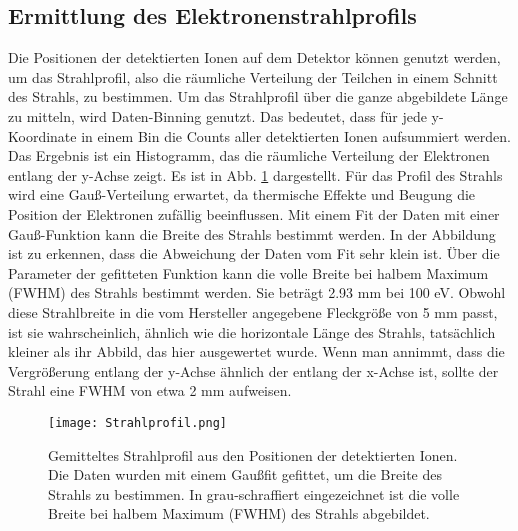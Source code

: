 \subsection{Ermittlung des Elektronenstrahlprofils}
Die Positionen der detektierten Ionen auf dem Detektor können genutzt werden, um das Strahlprofil, also die räumliche Verteilung der Teilchen in einem Schnitt des Strahls, zu bestimmen. Um das Strahlprofil über die ganze abgebildete Länge zu mitteln, wird Daten-Binning genutzt. Das bedeutet, dass für jede y-Koordinate in einem Bin die Counts aller detektierten Ionen aufsummiert werden. Das Ergebnis ist ein Histogramm, das die räumliche Verteilung der Elektronen entlang der y-Achse zeigt. Es ist in Abb. \ref{fig:Strahlprofil} dargestellt. Für das Profil des Strahls wird eine Gauß-Verteilung erwartet, da thermische Effekte und Beugung die Position der Elektronen zufällig beeinflussen. Mit einem Fit der Daten mit einer Gauß-Funktion kann die Breite des Strahls bestimmt werden. In der Abbildung ist zu erkennen, dass die Abweichung der Daten vom Fit sehr klein ist. Über die Parameter der gefitteten Funktion kann die volle Breite bei halbem Maximum (FWHM) des Strahls bestimmt werden. Sie beträgt 2.93 mm bei 100 eV. Obwohl diese Strahlbreite in die vom Hersteller angegebene Fleckgröße von 5 mm passt, ist sie wahrscheinlich, ähnlich wie die horizontale Länge des Strahls, tatsächlich kleiner als ihr Abbild, das hier ausgewertet wurde. Wenn man annimmt, dass die Vergrößerung entlang der y-Achse ähnlich der entlang der x-Achse ist, sollte der Strahl eine FWHM von etwa 2 mm aufweisen.

\begin{figure}
    \centering
    \texttt{[image: Strahlprofil.png]}
    \caption[Gemitteltes Strahlprofil]{Gemitteltes Strahlprofil aus den Positionen der detektierten Ionen. Die Daten wurden mit einem Gaußfit gefittet, um die Breite des Strahls zu bestimmen. In grau-schraffiert eingezeichnet ist die volle Breite bei halbem Maximum (FWHM) des Strahls abgebildet.}
    \label{fig:Strahlprofil} 
\end{figure}